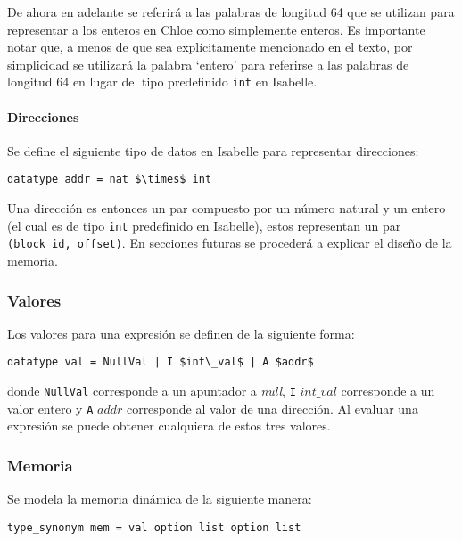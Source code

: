 De ahora en adelante se referirá a las palabras de longitud 64 que se utilizan para representar a los enteros en Chloe como simplemente enteros.
Es importante notar que, a menos de que sea explícitamente mencionado en el texto, por simplicidad se utilizará la palabra `entero' para referirse a las palabras de longitud 64 en lugar del tipo predefinido \verb|int| en Isabelle.

\paragraph*{Direcciones}

Se define el siguiente tipo de datos en Isabelle para representar direcciones:

\begin{lstlisting}[frame=single, mathescape=true]
datatype addr = nat $\times$ int
\end{lstlisting}

\begin{comment}
FIXME block_id, offset
\end{comment}
Una dirección es entonces un par compuesto por un número natural y un entero (el cual es de tipo \verb|int| predefinido en Isabelle), estos representan un par \verb|(block_id, offset)|.
En secciones futuras se procederá a explicar el diseño de la memoria.

\subsubsection*{Valores}

Los valores para una expresión se definen de la siguiente forma:

\begin{lstlisting}[frame=single, mathescape=true]
datatype val = NullVal | I $int\_val$ | A $addr$
\end{lstlisting}

donde \verb|NullVal| corresponde a un apuntador a \textit{null}, \verb|I| $int\_val$ corresponde a un valor entero y \verb|A| $addr$ corresponde al valor de una dirección.
Al evaluar una expresión se puede obtener cualquiera de estos tres valores.

\subsubsection*{Memoria}

Se modela la memoria dinámica de la siguiente manera:

\begin{lstlisting}[frame=single, mathescape=true]
type_synonym mem = val option list option list
\end{lstlisting}

